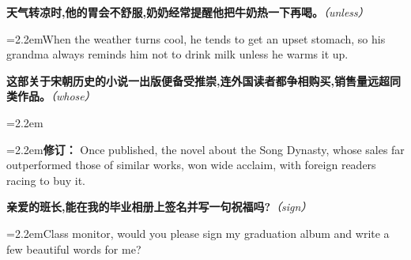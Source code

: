 \documentclass[11pt,a4paper]{article}
\newcommand{\num}[1]{\makebox[1.9em][r]{#1.}\hspace{0.3em}}
\newcommand{\prompt}[1]{\emph{\textcolor{tipblue}{\small（#1）}}}
\begin{document}
\begin{minipage}{\linewidth}

\num{43}\textbf{天气转凉时,他的胃会不舒服,奶奶经常提醒他把牛奶热一下再喝。}\prompt{unless}

\vspace{0.15em}

\noindent\hangindent=2.2em\hspace{2.2em}When the weather turns cool, he tends to get an upset stomach, so his grandma always reminds him not to drink milk unless he warms it up.

\end{minipage}

\begin{minipage}{\linewidth}

\num{44}\textbf{这部关于宋朝历史的小说一出版便备受推崇,连外国读者都争相购买,销售量远超同类作品。}\prompt{whose}

\vspace{0.15em}

\noindent\hangindent=2.2em

\noindent\hangindent=2.2em\hspace{2.2em}\textbf{修订：} Once published, the novel about the Song Dynasty, whose sales far outperformed those of similar works, won wide acclaim, with foreign readers racing to buy it.

\end{minipage}

\vspace{0.35em}\vspace{0.15em}

\begin{minipage}{\linewidth}

\num{45}\textbf{亲爱的班长,能在我的毕业相册上签名并写一句祝福吗?}\prompt{sign}

\vspace{0.15em}

\noindent\hangindent=2.2em\hspace{2.2em}Class monitor, would you please sign my graduation album and write a few beautiful words for me?

\end{minipage}
\end{document}
